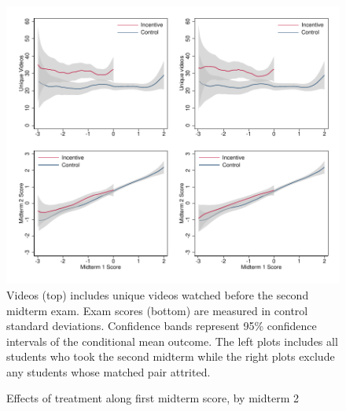 \documentclass[12pt]{article}
\begin{document}
\clearpage
\begin{figure}[t]
\begin{center}
\caption{Effects of treatment along first midterm score, by midterm 2}
\label{locallin_mid2}
\includegraphics[width=1\textwidth, angle=0]{../plots/lpolymid2}
\footnotesize Videos (top) includes unique videos watched before the second midterm exam.
Exam scores (bottom) are measured in control standard deviations.
Confidence bands represent 95\% confidence intervals of the conditional mean outcome.
The left plots includes all students who took the second midterm while the right plots exclude any students whose matched pair attrited.
\end{center}
\end{figure}
\end{document}
